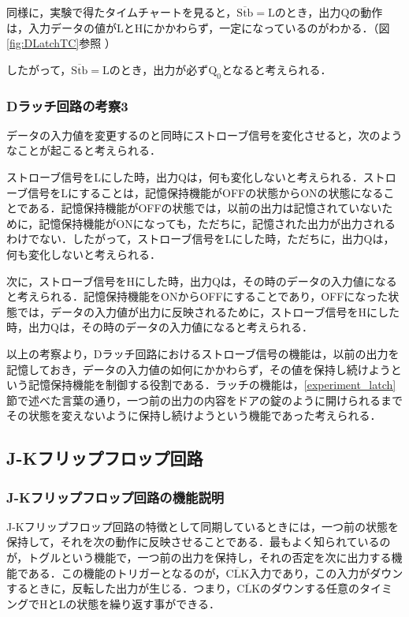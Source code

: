 同様に，実験で得たタイムチャートを見ると，$\overline{\mathrm{Stb}}=\mathrm{L}$のとき，出力$\mathrm{Q}$の動作は，入力データの値がLとHにかかわらず，一定になっているのがわかる．（図\ref{fig:DLatchTC}参照 ）

したがって，$\overline{\mathrm{Stb}}=\mathrm{L}$のとき，出力が必ず$\mathrm{Q_0}$となると考えられる．


%
%
\subsubsection{Dラッチ回路の考察3}
\label{DLatch_consideration3}
データの入力値を変更するのと同時にストローブ信号を変化させると，次のようなことが起こると考えられる．

ストローブ信号をLにした時，出力Qは，何も変化しないと考えられる．ストローブ信号をLにすることは，記憶保持機能がOFFの状態からONの状態になることである．記憶保持機能がOFFの状態では，以前の出力は記憶されていないために，記憶保持機能がONになっても，ただちに，記憶された出力が出力されるわけでない．したがって，ストローブ信号をLにした時，ただちに，出力Qは，何も変化しないと考えられる．

次に，ストローブ信号をHにした時，出力Qは，その時のデータの入力値になると考えられる．記憶保持機能をONからOFFにすることであり，OFFになった状態では，データの入力値が出力に反映されるために，ストローブ信号をHにした時，出力Qは，その時のデータの入力値になると考えられる．
\\
\par
以上の考察より，Dラッチ回路におけるストローブ信号の機能は，以前の出力を記憶しておき，データの入力値の如何にかかわらず，その値を保持し続けようという記憶保持機能を制御する役割である．ラッチの機能は，\ref{experiment_latch}節で述べた言葉の通り，一つ前の出力の内容をドアの錠のように開けられるまでその状態を変えないように保持し続けようという機能であった考えられる．

%
%
\subsection{J-Kフリップフロップ回路}
\label{experiment_JKflipflop}

%
%
\subsubsection{J-Kフリップフロップ回路の機能説明}
\label{JKFF_explain}
J-Kフリップフロップ回路の特徴として同期しているときには，一つ前の状態を保持して，それを次の動作に反映させることである．最もよく知られているのが，トグルという機能で，一つ前の出力を保持し，それの否定を次に出力する機能である．この機能のトリガーとなるのが，$\overline{\mathrm{CLK}}$入力であり，この入力がダウンするときに，反転した出力が生じる．つまり，$\overline{\mathrm{CLK}}$のダウンする任意のタイミングでHとLの状態を繰り返す事ができる．

